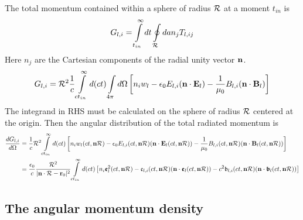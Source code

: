 The total momentum contained within a sphere of radius ${\cal R}$ at a moment $t_{in}$ is
\begin{align}
    G_{l,i}=\int\limits_{t_{in}}^{\infty}dt\oint\limits_{\cal R} da n_j T_{l,ij}
\end{align}
Here $n_j$ are the Cartesian components of the radial unity vector ${\bf n}$.
\begin{align}
    G_{l,i}={\cal R}^2\frac1{c}\int\limits_{ct_{in}}^{\infty}d(ct)\int\limits_{4\pi} d\Omega \left[n_i w_l-\epsilon_0E_{l,i}({\bf n}\cdot{\bf E}_l)-\frac1{\mu_0}B_{l,i}({\bf n}\cdot{\bf B}_l)\right]
\end{align}
The integrand in RHS  must be calculated on the sphere of radius ${\cal R}$ centered at the origin. Then the angular distribution of the total radiated momentum is
\begin{align}
    \frac{dG_{l,i}}{d\Omega} & =\frac1c {\cal R}^2\int\limits_{ct_{in}}^{\infty}d(ct) \left[n_i w_l(ct, {\bf n}{\cal R})-\epsilon_0E_{l,i}(ct, {\bf n}{\cal R})({\bf n}\cdot{\bf E}_l(ct, {\bf n}{\cal R}))-\frac1{\mu_0}B_{l,i}(ct, {\bf n}{\cal R})({\bf n}\cdot{\bf B}_l(ct, {\bf n}{\cal R}))\right]\nonumber                                                                                                                     \\
                             & =\frac{\epsilon_0}c \frac{{\cal R}^2}{|{\bf n}\cdot{\cal R} - {\bf r}_0|^2}\int\limits_{ct_{in}}^{\infty}d(ct) \left[n_i {\boldsymbol{\mathfrak e}}^2_l(ct, {\bf n}{\cal R})-{\mathfrak e}_{l,i}(ct, {\bf n}{\cal R})({\bf n}\cdot{\boldsymbol{\mathfrak e}}_l(ct, {\bf n}{\cal R}))-c^2{\mathfrak b}_{l,i}(ct, {\bf n}{\cal R})({\bf n}\cdot{\boldsymbol{\mathfrak b}}_l(ct, {\bf n}{\cal R}))\right]
\end{align}


\subsection{The angular momentum density}

